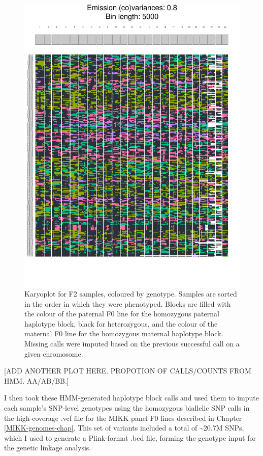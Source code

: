 \documentclass[
]{book}
\begin{document}
\begin{figure}
\includegraphics[width=1\linewidth]{figs/mikk_behaviour/karyoplot_no_missing} \caption{Karyoplot for F2 samples, coloured by genotype. Samples are sorted in the order in which they were phenotyped. Blocks are filled with the colour of the paternal F0 line for the homozygous paternal haplotype block, black for heterozygous, and the colour of the maternal F0 line for the homozygous maternal haplotype block. Missing calls were imputed based on the previous successful call on a given chromosome.}\label{fig:F2-recomb-blocks}
\end{figure}

{[}ADD ANOTHER PLOT HERE. PROPOTION OF CALLS/COUNTS FROM HMM. AA/AB/BB.{]}

I then took these HMM-generated haplotype block calls and used them to impute each sample's SNP-level genotypes using the homozygous biallelic SNP calls in the high-coverage .vcf file for the MIKK panel F0 lines described in Chapter \ref{MIKK-genomes-chap}. This set of variants included a total of \textasciitilde20.7M SNPs, which I used to generate a Plink-format .bed file, forming the genotype input for the genetic linkage analysis.
\end{document}
